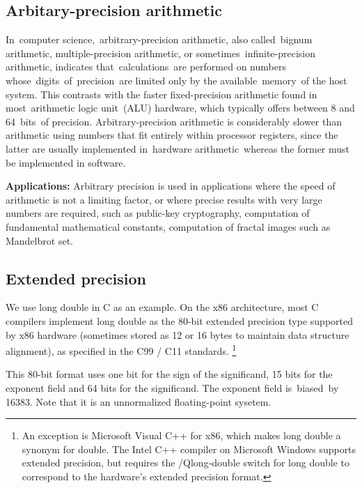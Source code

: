 \documentclass[12pt,a4paper]{extarticle}
\numberwithin{equation}{section}
\numberwithin{figure}{section}
\numberwithin{table}{section}
\theoremstyle{definition}
\begin{document}
\subsection{Arbitary-precision arithmetic}
In computer science, arbitrary-precision arithmetic, also called bignum arithmetic, multiple-precision arithmetic, or sometimes infinite-precision arithmetic, indicates that calculations are performed on numbers whose digits of precision are limited only by the available memory of the host system. This contrasts with the faster fixed-precision arithmetic found in most arithmetic logic unit (ALU) hardware, which typically offers between 8 and 64 bits of precision. Arbitrary-precision arithmetic is considerably slower than arithmetic using numbers that fit entirely within processor registers, since the latter are usually implemented in hardware arithmetic whereas the former must be implemented in software.\par
{\bf Applications:} Arbitrary precision is used in applications where the speed of arithmetic is not a limiting factor, or where precise results with very large numbers are required, such as public-key cryptography, computation of fundamental mathematical constants, computation of fractal images such as Mandelbrot set.
\subsection{Extended precision}
We use long double in C as an example. On the x86 architecture, most C compilers implement long double as the 80-bit extended precision type supported by x86 hardware (sometimes stored as 12 or 16 bytes to maintain data structure alignment), as specified in the C99 / C11 standards. \footnote{\scriptsize An exception is Microsoft Visual C++ for x86, which makes long double a synonym for double. The Intel C++ compiler on Microsoft Windows supports extended precision, but requires the /Qlong‑double switch for long double to correspond to the hardware's extended precision format.}\par This 80-bit format uses one bit for the sign of the significand, 15 bits for the exponent field and 64 bits for the significand. The exponent field is biased by 16383. Note that it is an unnormalized floating-point sysetem.
\begin{table}[!htbp]
    \small
    \centering
    \label{tab:ld}
    \caption{x86 long double}
\end{table}
\end{document}
